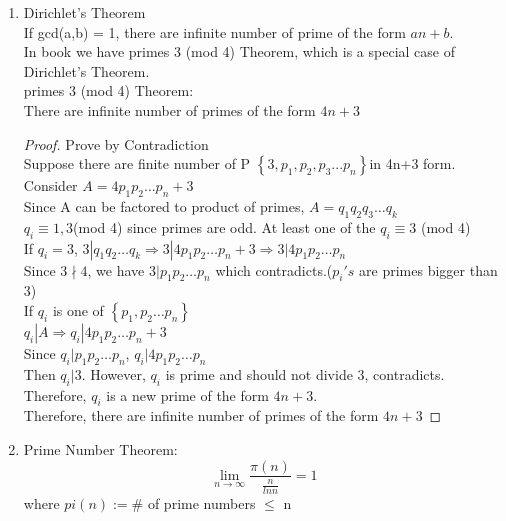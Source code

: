 \documentclass[10pt]{article}
\begin{document}
\begin{multicols}{2}
\begin{enumerate}
\begin{enumerate}
		Then $ax_0 \equiv c$(mod m). We want to find all x.\\
		Then $ax_0 = ax$ (mod m)\\
		$m | a(x-x_0)\Rightarrow \frac{m}{gcd(m,a)}|\frac{a}{gcd(m,a)}(x-x_0)$\\
		$gcd(\frac{m}{gcd(m,a)},\frac{a}{gcd(m,a)}) = 1\Rightarrow \frac{m}{gcd(m,a)}|x-x_0$\\
		$\Rightarrow x = x_0 + k\frac{m}{gcd(m,a)}$
		\item $x \equiv b$ (mod m), $x \equiv c$ (mod m), gcd(m,n) = 1\\
		Use Chinese Remainder Theorm's proof
	\end{enumerate}
	
	\item Dirichlet's Theorem\\
	If gcd(a,b) = 1, there are infinite number of prime of the form $an+b$.\\
	In book we have primes 3 (mod 4) Theorem, which is a special case of Dirichlet's Theorem.\\
	primes 3 (mod 4) Theorem:\\ There are infinite number of primes of the form $4n+3$
	\begin{proof}
		Prove by Contradiction\\
		Suppose there are finite number of P $\left\{3, p_1, p_2, p_3 ... p_n\right\}$in 4n+3 form.\\
		Consider $A = 4p_1p_2 \dots p_n + 3$\\
		Since A can be factored to product of primes, $A = q_1q_2q_3\dots q_k$\\
		$q_i \equiv 1,3$(mod 4) since primes are odd. At least one of the $q_i \equiv 3$ (mod 4)\\
		If $q_i = 3$, $3| q_1q_2\dots q_k \Rightarrow 3|4p_1p_2\dots p_n + 3 \Rightarrow 3|4p_1p_2\dots p_n $ \\
		Since $3 \nmid 4$, we have $3|p_1p_2 \dots p_n$ which contradicts.($p_i's$ are primes bigger than 3)\\
		If $q_i$ is one of $\left\{p_1,p_2\dots p_n\right\}$\\
		$q_i | A\Rightarrow q_i|4p_1p_2 \dots p_n + 3$\\
		Since $q_i | p_1p_2\dots p_n$, $q_i | 4p_1p_2 \dots p_n$\\
		Then $q_i | 3$. However, $q_i$ is prime and should not divide 3, contradicts.\\
		Therefore, $q_i$ is a new prime of the form $4n+3$.\\
		Therefore, there are infinite number of primes of the form $4n+3$
	\end{proof}

	\item Prime Number Theorem:
	$$\lim_{n\rightarrow \infty}\frac{\pi(n)}{\frac{n}{lnn}} = 1 $$
	where $pi(n):= \#$ of prime numbers $\le$ n
	
	
	
	
	
\end{enumerate}
\newpage
\end{multicols}
\end{document}
